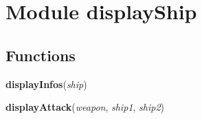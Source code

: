 %
%
%


\section{Module displayShip}

    \label{displayShip}


  \subsection{Functions}

    \label{displayShip:displayInfos}

    \vspace{0.5ex}

\hspace{.8\funcindent}\begin{boxedminipage}{\funcwidth}

    \raggedright \textbf{displayInfos}(\textit{ship})

\setlength{\parskip}{2ex}
\setlength{\parskip}{1ex}
    \end{boxedminipage}

    \label{displayShip:displayAttack}

    \vspace{0.5ex}

\hspace{.8\funcindent}\begin{boxedminipage}{\funcwidth}

    \raggedright \textbf{displayAttack}(\textit{weapon}, \textit{ship1}, \textit{ship2})

\setlength{\parskip}{2ex}
\setlength{\parskip}{1ex}
    \end{boxedminipage}

